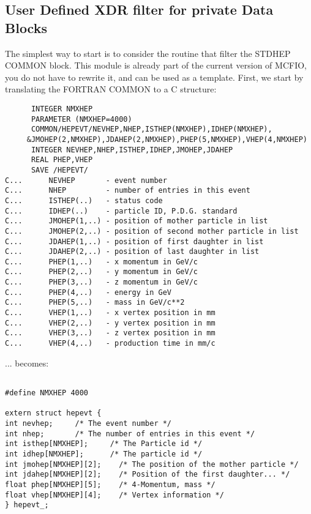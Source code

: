\subsection{User Defined XDR filter for private Data Blocks}

	The simplest way to start is to consider the routine that 
filter the STDHEP COMMON block.  This module is already part of 
the current version of MCFIO, you do not have to rewrite it, and 
can be used as a template. First, we start by translating the FORTRAN 
COMMON to a C structure: 

\begin{verbatim}
      INTEGER NMXHEP
      PARAMETER (NMXHEP=4000)
      COMMON/HEPEVT/NEVHEP,NHEP,ISTHEP(NMXHEP),IDHEP(NMXHEP),
     &JMOHEP(2,NMXHEP),JDAHEP(2,NMXHEP),PHEP(5,NMXHEP),VHEP(4,NMXHEP)
      INTEGER NEVHEP,NHEP,ISTHEP,IDHEP,JMOHEP,JDAHEP
      REAL PHEP,VHEP
      SAVE /HEPEVT/
C...      NEVHEP       - event number
C...      NHEP         - number of entries in this event
C...      ISTHEP(..)   - status code
C...      IDHEP(..)    - particle ID, P.D.G. standard
C...      JMOHEP(1,..) - position of mother particle in list
C...      JMOHEP(2,..) - position of second mother particle in list
C...      JDAHEP(1,..) - position of first daughter in list
C...      JDAHEP(2,..) - position of last daughter in list
C...      PHEP(1,..)   - x momentum in GeV/c
C...      PHEP(2,..)   - y momentum in GeV/c
C...      PHEP(3,..)   - z momentum in GeV/c
C...      PHEP(4,..)   - energy in GeV
C...      PHEP(5,..)   - mass in GeV/c**2
C...      VHEP(1,..)   - x vertex position in mm
C...      VHEP(2,..)   - y vertex position in mm
C...      VHEP(3,..)   - z vertex position in mm
C...      VHEP(4,..)   - production time in mm/c
\end{verbatim}

... becomes: 

\begin{verbatim}

#define NMXHEP 4000

extern struct hepevt {
int nevhep;		/* The event number */
int nhep;		/* The number of entries in this event */
int isthep[NMXHEP]; 	/* The Particle id */
int idhep[NMXHEP];      /* The particle id */
int jmohep[NMXHEP][2];    /* The position of the mother particle */
int jdahep[NMXHEP][2];    /* Position of the first daughter... */
float phep[NMXHEP][5];    /* 4-Momentum, mass */
float vhep[NMXHEP][4];    /* Vertex information */
} hepevt_;
\end{verbatim}

